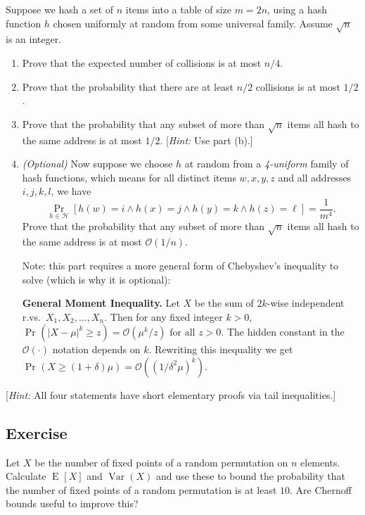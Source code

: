 \documentclass[14pt]{extreport}
\newcounter{counter}
\newcommand{\Exercise}{Exercise \stepcounter{counter}\thecounter}
\newcommand{\Var}[1]{\operatorname{Var}\left(#1\right)}
\newcommand{\E}[2][]{\operatorname{E}_{#1}\left[#2\right]}
\DeclareMathOperator*{\oldPr}{Pr}
\renewcommand{\Pr}[2][]{\operatorname{Pr}_{#1}\left(#2\right)}
\begin{document}
    \vspace{3mm}
    Suppose we hash a set of \( n \) items into a table of size \( m = 2n \), using a hash function \( h \) chosen uniformly at random from some universal family. Assume \( \sqrt{n} \) is an integer.
    \begin{enumerate}
        \item Prove that the expected number of collisions is at most \( n/4 \).
        \item  Prove that the probability that there are at least \( n/2 \) collisions is at most \( 1/2 \).
        \item  Prove that the probability that any subset of more than \( \sqrt{n} \) items all hash to the same address is at most \( 1/2 \). [\textit{Hint:} Use part (b).]
        \item \textit{(Optional)} Now suppose we choose \( h \) at random from a \textit{4-uniform} family of hash functions, which means for all distinct items \( w, x, y, z \) and all addresses \( i, j, k, l \), we have \[ \oldPr_{h\in\mathcal{H}}\left[h(w) = i \wedge h(x) = j \wedge h(y) = k \wedge h(z) = \ell\right] = \frac{1}{m^4}. \] Prove that the probability that any subset of more than \( \sqrt{n} \) items all hash to the same address is at most \( \mathcal{O}(1/n) \).

        \vspace{2mm}
        Note: this part requires a more general form of Chebyshev's inequality to solve (which is why it is optional):
        \begin{tcolorbox}
        {\small
            \textbf{General Moment Inequality.} Let $X$ be the sum of \( 2k \)-wise independent r.vs.\ \( X_1, X_2, \ldots, X_n \). Then for any fixed integer \( k > 0 \), \( \Pr{|X - \mu|^k \geq z} = \mathcal{O}\left(\mu^k/z\right) \text{ for all } z > 0. \) The hidden constant in the \( \mathcal{O}(\cdot) \) notation depends on \( k \).
        Rewriting this inequality we get $\Pr{X \ge (1 + \delta) \mu} = \mathcal{O}\left(\left(1/\delta^{2}\mu\right)^{k}\right)$.
        }
        \end{tcolorbox}
    \end{enumerate}
    [\textit{Hint:} All four statements have short elementary proofs via tail inequalities.]

\subsection*{\Exercise}
    Let $X$ be the number of fixed points of a random permutation on $n$ elements. Calculate $\E{X}$ and $\Var{X}$ and use these to bound the probability that the number of fixed points of a random permutation is at least $10$. Are Chernoff bounds useful to improve this?
\end{document}
